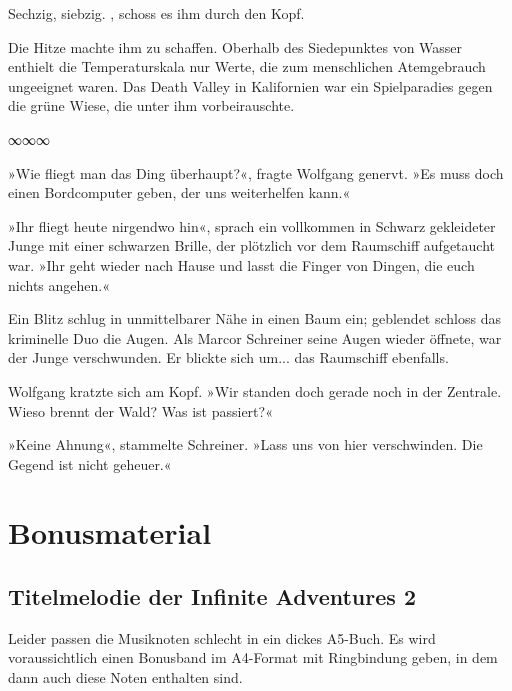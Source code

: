 Sechzig, siebzig. , schoss es ihm durch den Kopf. 

Die Hitze machte ihm zu schaffen. Oberhalb des Siedepunktes von Wasser enthielt die Temperaturskala nur Werte, die zum menschlichen Atemgebrauch ungeeignet waren. Das Death Valley in Kalifornien war ein Spielparadies gegen die grüne Wiese, die unter ihm vorbeirauschte.




\begin{center}
	∞∞∞
\end{center}

»Wie fliegt man das Ding überhaupt?«, fragte Wolfgang genervt. »Es muss doch einen Bordcomputer geben, der uns weiterhelfen kann.«

»Ihr fliegt heute nirgendwo hin«, sprach ein vollkommen in Schwarz gekleideter Junge mit einer schwarzen Brille, der plötzlich vor dem Raumschiff aufgetaucht war. »Ihr geht wieder nach Hause und lasst die Finger von Dingen, die euch nichts angehen.«

Ein Blitz schlug in unmittelbarer Nähe in einen Baum ein; geblendet schloss das kriminelle Duo die Augen. Als Marcor Schreiner seine Augen wieder öffnete, war der Junge verschwunden. Er blickte sich um... das Raumschiff ebenfalls.

Wolfgang kratzte sich am Kopf. »Wir standen doch gerade noch in der Zentrale. Wieso brennt der Wald? Was ist passiert?«

»Keine Ahnung«, stammelte Schreiner. »Lass uns von hier verschwinden. Die Gegend ist nicht geheuer.«


\part{Bonusmaterial}

\chapter{Titelmelodie der Infinite Adventures 2}

Leider passen die Musiknoten schlecht in ein dickes A5-Buch. Es wird voraussichtlich einen Bonusband im A4-Format mit Ringbindung geben, in dem dann auch diese Noten enthalten sind.

%


